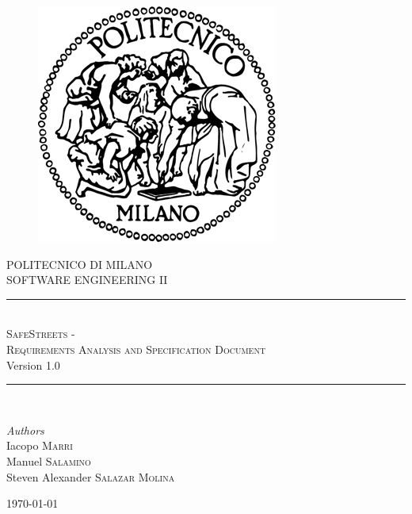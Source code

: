 \documentclass[11pt,a4paper]{article}
\begin{document}
\begin{figure}[t]
    \includegraphics[scale=0.8]{Images/logo_polimi.png}
    \centering
\end{figure}

\begin{titlepage}
    \newcommand{\HRule}{\rule{\linewidth}{0.5mm}}
    \center
    \textsc{\LARGE POLITECNICO DI MILANO}\\[1.5cm]
	
	\textsc{\Large SOFTWARE ENGINEERING II}\\[0.5cm]
	
	\HRule\\[0.4cm]
	    {\huge \textsc{SafeStreets - \\Requirements Analysis and Specification Document}}\\[0.4cm]
	    Version 1.0
    \HRule\\[1.5cm]
	
	\begin{minipage}{1\textwidth}
		\begin{flushleft}
			\large
			\textit{Authors}\\
			Iacopo \textsc{Marri}\\
			Manuel \textsc{Salamino}\\
			Steven Alexander \textsc{Salazar Molina}
		\end{flushleft}
	\end{minipage}
	
	\vfill\vfill\vfill %
	
	{\large\today}
	
\end{titlepage}


\newpage

\tableofcontents






%
\end{document}
